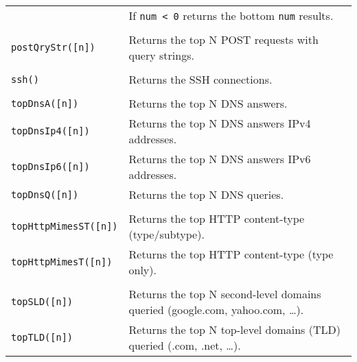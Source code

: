 \documentclass[documentation]{subfiles}
\begin{document}
\begin{longtable}{ll}
                             & If {\tt num < 0} returns the bottom {\tt num} results.\\\\
    {\tt postQryStr([n])} & Returns the top N POST requests with query strings.\\\\
    {\tt ssh()} & Returns the SSH connections.\\\\
    {\tt topDnsA([n])} & Returns the top N DNS answers.\\
    {\tt topDnsIp4([n])} & Returns the top N DNS answers IPv4 addresses.\\
    {\tt topDnsIp6([n])} & Returns the top N DNS answers IPv6 addresses.\\
    {\tt topDnsQ([n])} & Returns the top N DNS queries.\\\\
    {\tt topHttpMimesST([n])} & Returns the top HTTP content-type (type/subtype).\\
    {\tt topHttpMimesT([n])} & Returns the top HTTP content-type (type only).\\\\
    {\tt topSLD([n])} & Returns the top N second-level domains queried (google.com, yahoo.com, \ldots).\\
    {\tt topTLD([n])} & Returns the top N top-level domains (TLD) queried (.com, .net, \ldots).\\
    \bottomrule
\end{longtable}
\end{document}
